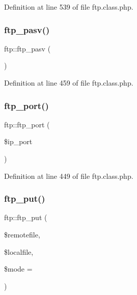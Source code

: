 Definition at line 539 of file ftp.\+class.\+php.

\mbox{\label{classftp_a9141940878edcf85afee18e8dcdc6064}} 
\subsubsection{\texorpdfstring{ftp\+\_\+pasv()}{ftp\_pasv()}}
{\footnotesize\ttfamily ftp\+::ftp\+\_\+pasv (\begin{DoxyParamCaption}{ }\end{DoxyParamCaption})}



Definition at line 459 of file ftp.\+class.\+php.

\mbox{\label{classftp_a94ba304efdf7e1a4a0053d94706a36c9}} 
\subsubsection{\texorpdfstring{ftp\+\_\+port()}{ftp\_port()}}
{\footnotesize\ttfamily ftp\+::ftp\+\_\+port (\begin{DoxyParamCaption}\item[{}]{\$ip\+\_\+port }\end{DoxyParamCaption})}



Definition at line 449 of file ftp.\+class.\+php.

\mbox{\label{classftp_a509ed4c9d69177fe1b0ad2a02fbc8c27}} 
\subsubsection{\texorpdfstring{ftp\+\_\+put()}{ftp\_put()}}
{\footnotesize\ttfamily ftp\+::ftp\+\_\+put (\begin{DoxyParamCaption}\item[{}]{\$remotefile,  }\item[{}]{\$localfile,  }\item[{}]{\$mode = {} }\end{DoxyParamCaption})}




